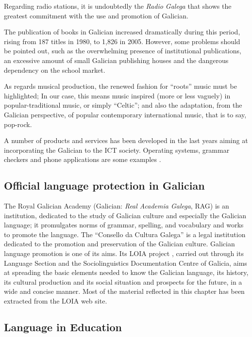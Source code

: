 \begin{multicols}{2}
Regarding radio stations, it is undoubtedly the \textit{Radio Galega} that shows the greatest commitment with the use and promotion of Galician. 

The publication of books in Galician increased dramatically during this period, rising from 187 titles in 1980, to 1,826 in 2005. However, some problems should be pointed out, such as the overwhelming presence of institutional publications, an excessive amount of small Galician publishing houses and the dangerous dependency on the school market. 

As regards musical production, the renewed fashion for “roots” music must be highlighted; In our case, this means music inspired (more or less vaguely) in popular-traditional music, or simply “Celtic”; and also the adaptation, from the Galician perspective, of popular contemporary international music, that is to say, pop-rock.

A number of products and services has been developed in the last years aiming at incorporating the Galician to the ICT society. Operating systems, grammar checkers and phone applications are some examples \cite{GAL-Nota10}.

\subsection{Official language protection in Galician}

   The Royal Galician Academy \cite{GAL-Nota11} (Galician: \textit{Real Academia Galega}, RAG) is an institution, dedicated to the study of Galician culture and especially the Galician language; it promulgates norms of grammar, spelling, and vocabulary and works to promote the language. 
The “Consello da Cultura Galega” \cite{GAL-Nota12}  is a legal institution dedicated to the promotion and preservation of the Galician culture. Galician language promotion is one of its aims. Its LOIA project \cite{GAL-Nota13}, carried out through its Language Section and the Sociolinguistics Documentation Centre of Galicia, aims at spreading the basic elements needed to know the Galician language, its history, its cultural production and its social situation and prospects for the future, in a wide and concise manner. Most of the material reflected in this chapter has been extracted from the LOIA web site.

\subsection{Language in Education}


\end{multicols}
